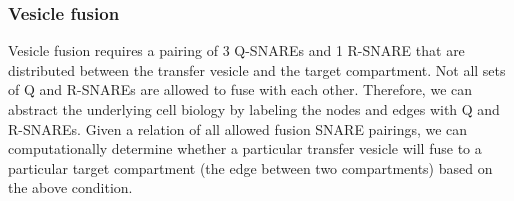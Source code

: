 
\subsubsection{Vesicle fusion}
%
% 
%
%  
%
%
Vesicle fusion requires a pairing of 3 Q-SNAREs and 1 R-SNARE that are distributed between the transfer vesicle and the target compartment. 
%
%
Not all sets of Q and R-SNAREs are allowed to fuse with each other.
%
%
Therefore, we can abstract the underlying cell biology by labeling the nodes and edges with Q and R-SNAREs. 
%
%
Given a relation of all allowed fusion SNARE pairings, we can computationally determine whether a particular transfer vesicle will fuse to a particular target compartment (the edge between two compartments) based on the above condition.  

